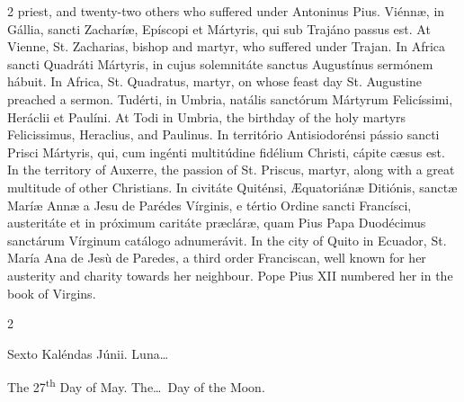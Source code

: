 \begin{paracol}{2}
 priest, and twenty-two others who suffered under Antoninus Pius.
\switchcolumn*
{}
Viénnæ, in Gállia, 
 sancti Zacharíæ, Epíscopi et Mártyris, qui sub Trajáno passus est.
\switchcolumn
{}
At Vienne, St. Zacharias, bishop and 
 martyr, who suffered under Trajan.
\switchcolumn*
{}
In Africa sancti 
 Quadráti Mártyris, in cujus solemnitáte sanctus Augustínus sermónem hábuit.
\switchcolumn
{}
In Africa, St. Quadratus, martyr, 
 on whose feast day St. Augustine preached a sermon.
\switchcolumn*
{}
Tudérti, in Umbria, 
 natális sanctórum Mártyrum Felicíssimi, Heráclii et Paulíni.
\switchcolumn
{}
At Todi in Umbria, the birthday of 
 the holy martyrs Felicissimus, Heraclius, and Paulinus.
\switchcolumn*
{}
In território Antisiodorénsi pássio sancti Prisci Mártyris, qui, cum ingénti multitúdine 
 fidélium Christi, cápite cæsus est.
\switchcolumn
{}
In the territory of Auxerre, the 
 passion of St. Priscus, martyr, along with a great multitude of other 
 Christians.
\switchcolumn*
{}
In civitáte Quiténsi, 
 Æquatoriánæ Ditiónis, sanctæ Maríæ Annæ a Jesu de Parédes Vírginis, e tértio 
 Ordine sancti Francísci, austeritáte et in próximum caritáte præcláræ, quam 
 Pius Papa Duodécimus sanctárum Vírginum catálogo adnumerávit.
\switchcolumn
{}
In the city of Quito in Ecuador, 
 St. María Ana de Jesù de Paredes, a third order Franciscan, well known for 
 her austerity and charity towards her neighbour. Pope Pius XII 
 numbered her in the book of Virgins.
\switchcolumn*
{}
\end{paracol}


\begin{paracol}{2}
\begin{center}{\color{gregoriocolor} Sexto Kaléndas Júnii. 
 Luna\dots\ }\end{center}
\switchcolumn
{}
\begin{center}{\color{gregoriocolor} The 
 27\textsuperscript{th} Day of May. The\dots\ Day of the Moon.}\end{center}
\end{paracol}

